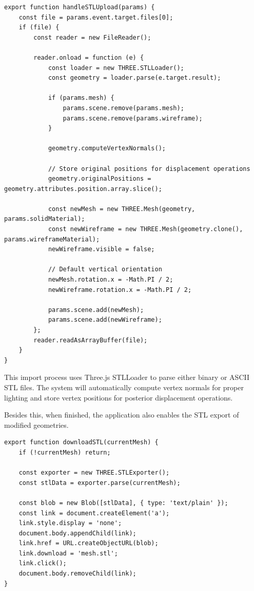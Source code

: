 \begin{verbatim}
export function handleSTLUpload(params) {
    const file = params.event.target.files[0];
    if (file) {
        const reader = new FileReader();
        
        reader.onload = function (e) {
            const loader = new THREE.STLLoader();
            const geometry = loader.parse(e.target.result);

            if (params.mesh) {
                params.scene.remove(params.mesh);
                params.scene.remove(params.wireframe);
            }

            geometry.computeVertexNormals();
            
            // Store original positions for displacement operations
            geometry.originalPositions = geometry.attributes.position.array.slice();

            const newMesh = new THREE.Mesh(geometry, params.solidMaterial);
            const newWireframe = new THREE.Mesh(geometry.clone(), params.wireframeMaterial);
            newWireframe.visible = false;

            // Default vertical orientation
            newMesh.rotation.x = -Math.PI / 2;
            newWireframe.rotation.x = -Math.PI / 2;

            params.scene.add(newMesh);
            params.scene.add(newWireframe);
        };
        reader.readAsArrayBuffer(file);
    }
}
\end{verbatim}

This import process uses Three.js STLLoader to parse either binary or ASCII STL files. The system will automatically compute vertex normals for proper lighting and store vertex positions for posterior displacement operations.

\vspace{0.5cm}

Besides this, when finished, the application also enables the STL export of modified geometries.

\begin{verbatim}
export function downloadSTL(currentMesh) {
    if (!currentMesh) return;
    
    const exporter = new THREE.STLExporter();
    const stlData = exporter.parse(currentMesh);

    const blob = new Blob([stlData], { type: 'text/plain' });
    const link = document.createElement('a');
    link.style.display = 'none';
    document.body.appendChild(link);
    link.href = URL.createObjectURL(blob);
    link.download = 'mesh.stl';
    link.click();
    document.body.removeChild(link);
}
\end{verbatim}

